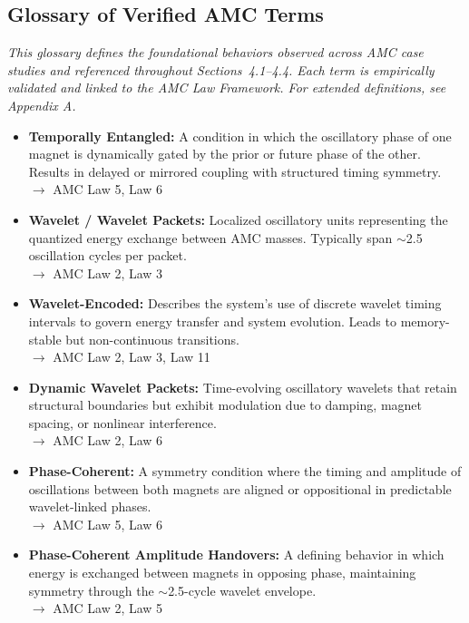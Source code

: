 \documentclass[10pt,aps,pre,onecolumn,superscriptaddress,notitlepage]{revtex4-2}
\begin{document}
\subsection*{Glossary of Verified AMC Terms}

\textit{This glossary defines the foundational behaviors observed across AMC case studies and referenced throughout Sections~4.1--4.4. Each term is empirically validated and linked to the AMC Law Framework. For extended definitions, see Appendix A.}

\begin{itemize}

  \item \textbf{Temporally Entangled:} A condition in which the oscillatory phase of one magnet is dynamically gated by the prior or future phase of the other. Results in delayed or mirrored coupling with structured timing symmetry.\\
  $\rightarrow$ AMC Law 5, Law 6

  \item \textbf{Wavelet / Wavelet Packets:} Localized oscillatory units representing the quantized energy exchange between AMC masses. Typically span $\sim$2.5 oscillation cycles per packet.\\
  $\rightarrow$ AMC Law 2, Law 3

  \item \textbf{Wavelet-Encoded:} Describes the system’s use of discrete wavelet timing intervals to govern energy transfer and system evolution. Leads to memory-stable but non-continuous transitions.\\
  $\rightarrow$ AMC Law 2, Law 3, Law 11

  \item \textbf{Dynamic Wavelet Packets:} Time-evolving oscillatory wavelets that retain structural boundaries but exhibit modulation due to damping, magnet spacing, or nonlinear interference.\\
  $\rightarrow$ AMC Law 2, Law 6

  \item \textbf{Phase-Coherent:} A symmetry condition where the timing and amplitude of oscillations between both magnets are aligned or oppositional in predictable wavelet-linked phases.\\
  $\rightarrow$ AMC Law 5, Law 6

  \item \textbf{Phase-Coherent Amplitude Handovers:} A defining behavior in which energy is exchanged between magnets in opposing phase, maintaining symmetry through the $\sim$2.5-cycle wavelet envelope.\\
  $\rightarrow$ AMC Law 2, Law 5


\end{itemize}
\end{document}
